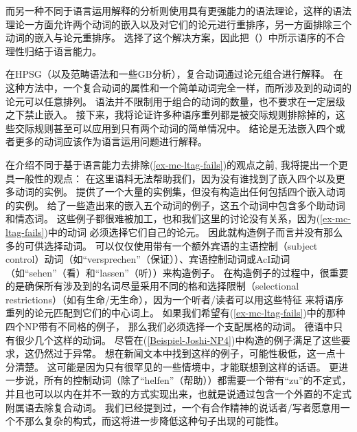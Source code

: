 而另一种不同于语言运用解释的分析则使用具有更强能力的语法理论，这样的语法理论一方面允许两个动词的嵌入以及对它们的论元进行重排序，另一方面排除三个动词的嵌入与论元重排序。
\citet{JBR2000a}选择了这个解决方案，因此把（）中所示语序的不合理性归结于语言能力。 

在HPSG（以及范畴语法\indexcg 和一些GB分析\indexgb），复合动词通过论元组合进行解释\citep{HN89b,HN94a}。 
在这种方法中，一个复合动词的属性和一个简单动词完全一样，而所涉及到的动词的论元可以任意排列。
语法并不限制用于组合的动词的数量，也不要求在一定层级之下禁止嵌入。
接下来，我将论证许多种语序重列都是被交际规则排除掉的，这些交际规则甚至可以应用到只有两个动词的简单情况中。
结论是无法嵌入四个或者更多的动词应该作为语言运用问题进行解释。

在介绍不同于基于语言能力去排除(\ref{ex-mc-ltag-fails})的观点之前, 我将提出一个更具一般性的观点：
在这里语料无法帮助我们，因为没有谁找到了嵌入四个以及更多动词的实例。
\citet{Bech55a}提供了一个大量的实例集，但没有构造出任何包括四个嵌入动词的实例。
\citet[--95]{Meurers99c}给了一些造出来的嵌入五个动词的例子，这五个动词中包含多个助动词和情态词。
这些例子都很难被加工，也和我们这里的讨论没有关系，因为(\ref{ex-mc-ltag-fails})中的动词
必须选择它们自己的论元。
因此就构造例子而言并没有那么多的可供选择动词。
可以仅仅使用带有一个额外宾语的主语控制（subject control）动词（如``versprechen''（保证））、宾语控制动词或AcI动词（如``sehen''（看）和``lassen''（听））来构造例子。
在构造例子的过程中，很重要的是确保所有涉及到的名词尽量采用不同的格和选择限制（selectional restrictions）（如有生命/无生命），因为一个听者/读者可以用这些特征
来将语序重列的论元匹配到它们的中心词上。
如果我们希望有(\ref{ex-mc-ltag-fails})中的那种四个NP带有不同格的例子，
那么我们必须选择一个支配属格的动词。
德语中只有很少几个这样的动词。
尽管\citet{JBR2000a}在(\ref{Beispiel-Joshi-NP4})中构造的例子满足了这些要求，这仍然过于异常。
想在新闻文本中找到这样的例子，可能性极低，这一点十分清楚。
这可能是因为只有很罕见的一些情境中，才能联想到这样的话语。
更进一步说，所有的控制动词（除了``helfen''（帮助））都需要一个带有``zu''的不定式，
并且也可以以内在并不一致的方式实现出来，也就是说通过包含一个外置的不定式附属语去除复合动词。
我们已经提到过，一个有合作精神的说话者/写者愿意用一个不那么复杂的构式，而这将进一步降低这种句子出现的可能性。

